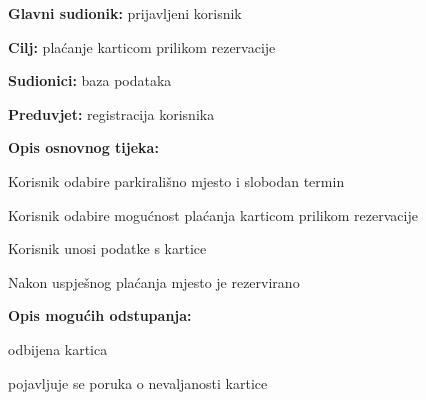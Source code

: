 					\noindent {}
					\begin{packed_item}
						
						\item \textbf{Glavni sudionik: }prijavljeni korisnik
						\item  \textbf{Cilj:} plaćanje karticom prilikom rezervacije
						\item  \textbf{Sudionici:} baza podataka
						\item  \textbf{Preduvjet:} registracija korisnika
						\item  \textbf{Opis osnovnog tijeka:}
						
						\item[] \begin{packed_enum}
							
							\item  Korisnik odabire parkirališno mjesto i slobodan termin
							\item  Korisnik odabire mogućnost plaćanja karticom prilikom rezervacije
							\item Korisnik unosi podatke s kartice
							\item Nakon uspješnog plaćanja mjesto je rezervirano
						\end{packed_enum}
						
						\item  \textbf{Opis mogućih odstupanja:}
						
						\item[] \begin{packed_item}
							
							\item[2.a] odbijena kartica
							\item[] \begin{packed_enum}
								
								\item pojavljuje se poruka o nevaljanosti kartice
								
							\end{packed_enum}

							
						\end{packed_item}
					\end{packed_item}
					
